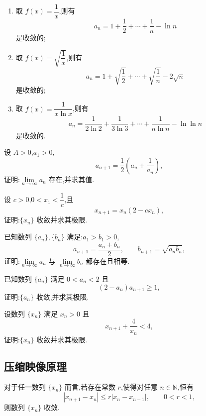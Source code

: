 \documentclass[../数学分析培优讲义.tex]{subfiles}
\begin{document}
\begin{remark}
\begin{enumerate}[label=(\arabic*)]
  \item 取 $f(x)=\dfrac{1}{x}$,则有
  \[
  a_n=1+\dfrac{1}{2}+\cdots+\dfrac{1}{n}-\ln n
  \]
  是收敛的;
  \item 取 $f(x)=\sqrt{\dfrac{1}{x}}$,则有
  \[
  a_n=1+\sqrt{\dfrac{1}{2}}+\cdots+\sqrt{\dfrac{1}{n}}-2\sqrt n
  \]
  是收敛的;
  \item 取 $f(x)=\dfrac{1}{x\ln x}$,则有
  \[
  a_n=\dfrac{1}{2\ln2}+\dfrac{1}{3\ln3}+\cdots+\dfrac{1}{n\ln n}-\ln\ln n
  \]
  是收敛的.
\end{enumerate}
\end{remark}

\begin{example}
设 $A>0$,$a_1>0$,
\[
a_{n+1}=\dfrac{1}{2}\left(a_n+\dfrac{1}{a_n}\right),
\]
证明:$\displaystyle \lim\limits_{n\to\infty}a_n$ 存在,并求其值.
\end{example}
\exampleblank

\begin{example}
设 $c>0$,$0<x_1<\dfrac{1}{c}$,且
\[
x_{n+1}=x_n(2-cx_n),
\]
证明:$\{x_n\}$ 收敛并求其极限.
\end{example}
\exampleblank

\begin{example}
已知数列 $\{a_n\},\{b_n\}$ 满足:$a_1>b_1>0$,
\[
a_{n+1}=\dfrac{a_n+b_n}{2},
\qquad
b_{n+1}=\sqrt{a_nb_n},
\]
证明:$\displaystyle \lim\limits_{n\to\infty}a_n$ 与 $\displaystyle \lim\limits_{n\to\infty}b_n$ 都存在且相等.
\end{example}
\exampleblank

\begin{example}
已知数列 $\{a_n\}$ 满足 $0<a_n<2$ 且
\[
(2-a_n)a_{n+1}\geq1,
\]
证明:$\{a_n\}$ 收敛,并求其极限.
\end{example}
\exampleblank

\begin{example}
设数列 $\{x_n\}$ 满足 $x_n>0$ 且
\[
x_{n+1}+\dfrac{4}{x_n}<4,
\]
证明:$\{x_n\}$ 收敛并求其极限.
\end{example}
\exampleblank


\newpage

\subsection{压缩映像原理}

\begin{theorem}[\markstar]
对于任一数列 $\{x_n\}$ 而言,若存在常数 $r$,使得对任意 $n\in\mathbb N$,恒有
\[
|x_{n+1}-x_n|\leq r|x_n-x_{n-1}|,
\qquad 0<r<1,
\]
则数列 $\{x_n\}$ 收敛.
\end{theorem}
\end{document}
